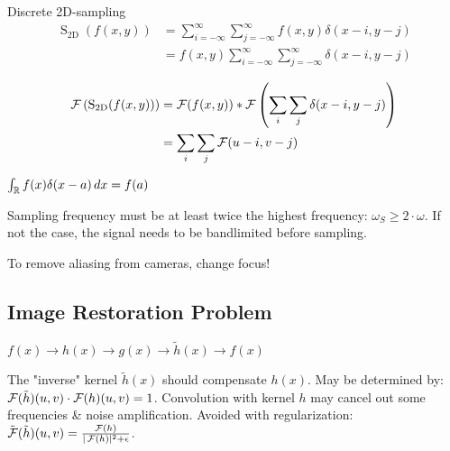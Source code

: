 \begin{definition}
  Discrete 2D-sampling
  \[\begin{aligned} \operatorname{S}_{2 \mathrm{D}}(f(x, y)) & =\sum_{i=-\infty}^{\infty} \sum_{j=-\infty}^{\infty} f(x, y) \delta(x-i, y-j) \\ & =f(x, y) \sum_{i=-\infty}^{\infty} \sum_{j=-\infty}^{\infty} \delta(x-i, y-j)\end{aligned}\]
\end{definition}

\begin{definition}
  \begin{align*}
    \operatorname{\mathcal{F}}\left(\operatorname{S}_{2 \mathrm{D}}(f(x, y))\right) & = \operatorname{\mathcal{F}}(f(x, y)) \ast \operatorname{\mathcal{F}}\left(\sum_{i} \sum_{j} \delta(x-i, y-j)\right) \\
    & = \sum_i \sum_j \operatorname{\mathcal{F}}(u - i, v - j)
  \end{align*}
\end{definition}

\begin{definition}
  \(\int_{\operatorname{\mathbb{R}}} f(x) \delta(x - a) \, dx = f(a)\)
\end{definition}

\begin{algorithm}
  Sampling frequency must be at least twice the highest frequency: \(\omega_S \geq 2 \cdot \omega\). If not the case, the signal needs to be bandlimited before sampling.
\end{algorithm}

\begin{theorem}
  To remove aliasing from cameras, change focus!
\end{theorem}

\subsection{Image Restoration Problem}
\begin{center}
  \(f(x) \to h(x) \to g(x) \to \tilde{h}(x) \to f(x)\)
\end{center}
The "inverse" kernel \(\tilde{h}(x)\) should compensate \(h(x)\). May be determined by: \(\operatorname{\mathcal{F}}(\tilde{h})(u, v) \cdot \operatorname{\mathcal{F}}(h)(u, v) = 1\). Convolution with kernel \(h\) may cancel out some frequencies \& noise amplification. Avoided with regularization: \(\tilde{\operatorname{\mathcal{F}}}(\tilde{h})(u, v) = \frac{\operatorname{\mathcal{F}}(h)}{|\operatorname{\mathcal{F}}(h)|^2 + \epsilon}\).
